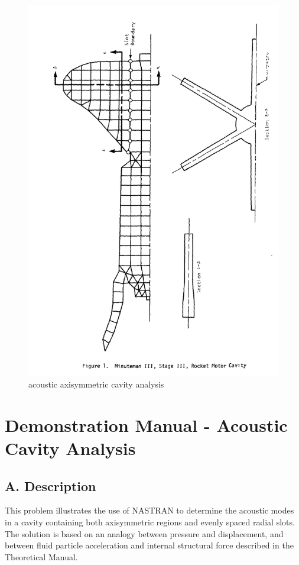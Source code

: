 \documentclass{article}
\begin{document}
\begin{figure}[h]
    \centering
\includegraphics[scale=0.35]{nastran_fig1}
    \caption{acoustic axisymmetric cavity analysis}
\end{figure}

\section{Demonstration Manual - Acoustic Cavity Analysis}


\subsection{A. Description}

This problem illustrates the use of NASTRAN to determine the acoustic modes in a cavity
containing both axisymmetric regions and evenly spaced radial slots. The solution is based
on an analogy between pressure and displacement, and between fluid particle acceleration and
internal structural force described in the Theoretical Manual.
\end{document}
